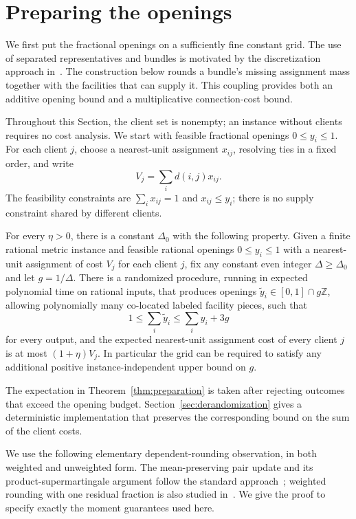 \section{Preparing the openings}\label{sec:preparation}

We first put the fractional openings on a sufficiently fine constant grid.
The use of separated representatives and bundles is motivated by the
discretization approach in~\cite{ByrkaEtAl2026}.  The construction below
rounds a bundle's missing assignment mass together with the facilities
that can supply it.  This coupling provides both an additive opening
bound and a multiplicative connection-cost bound.

Throughout this Section, the client set is nonempty; an instance without
clients requires no cost analysis.  We start with feasible fractional
openings $0\le y_i\le1$.  For each client $j$, choose a nearest-unit
assignment $x_{ij}$, resolving ties in a fixed order, and write
\[
 V_j=\sum_i d(i,j)x_{ij}.
\]
The feasibility constraints are $\sum_i x_{ij}=1$ and $x_{ij}\le y_i$;
there is no supply constraint shared by different clients.

\begin{theorem}\label{thm:preparation}
For every $\eta>0$, there is a constant $\Delta_0$ with the following
property.  Given a finite rational metric instance and feasible rational
openings $0\le y_i\le1$ with a nearest-unit assignment of cost $V_j$
for each client $j$, fix any constant even integer $\Delta\ge\Delta_0$ and let
$g=1/\Delta$.  There is a randomized procedure, running in expected
polynomial time on rational inputs, that produces openings
$\widetilde y_i\in[0,1]\cap g\mathbb Z$, allowing polynomially many
co-located labeled facility pieces, such that
\[
 1\le\sum_i\widetilde y_i\le\sum_i y_i+3g
\]
for every output, and the expected nearest-unit assignment cost of every
client $j$ is at most $(1+\eta)V_j$.
In particular the grid can be required to satisfy any additional
positive instance-independent upper bound on $g$.
\end{theorem}

The expectation in Theorem~\ref{thm:preparation} is taken after rejecting
outcomes that exceed the opening budget.  Section~\ref{sec:derandomization}
gives a deterministic implementation that preserves the corresponding
bound on the sum of the client costs.

We use the following elementary dependent-rounding observation, in both
weighted and unweighted form. The mean-preserving pair update and its
product-supermartingale argument follow the standard
approach~\cite{Srinivasan2001,GandhiEtAl2006}; weighted rounding with one
residual fraction is also studied in~\cite[Section~2]{ByrkaEtAl2017}.
We give the proof to specify exactly the moment guarantees used here.

